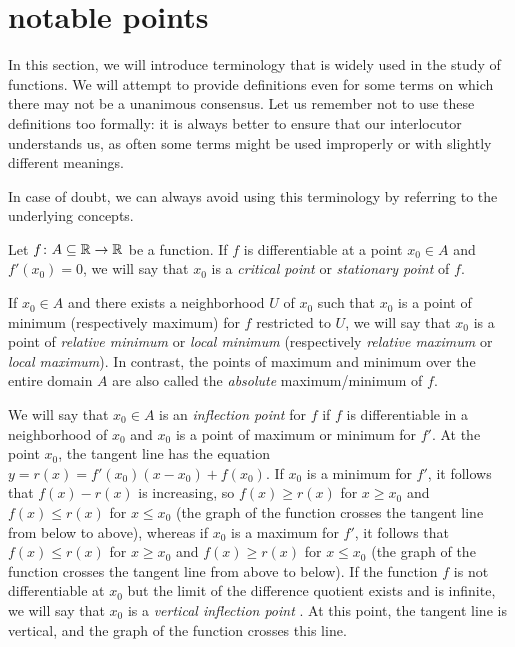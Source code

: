 \section{notable points}

In this section, we will introduce terminology that is widely used in the study
of functions. We will attempt to provide definitions even for some terms on
which there may not be a unanimous consensus. Let us remember not to use these
definitions too formally: it is always better to ensure that our interlocutor
understands us, as often some terms might be used improperly or with slightly
different meanings.

In case of doubt, we can always avoid using this terminology by referring to the
underlying concepts.

\begin{definition}
Let $f\colon A \subseteq {\mathbb R} \to {\mathbb R}$ be a function. If $f$ is differentiable at a
point $x_0\in A$ and $f'(x_0) = 0$, we will say that $x_0$ is a \emph{critical
point}%
%
or
\emph{stationary point}
of $f$.

If $x_0\in A$ and there exists a neighborhood $U$ of $x_0$ such that $x_0$ is a
point of minimum (respectively maximum) for $f$ restricted to $U$, we will say
that $x_0$ is a point of \emph{relative minimum}%
%
 or \emph{local minimum}
(respectively \emph{relative maximum} or \emph{local maximum}).
In contrast, the points of maximum and minimum over the entire domain $A$ are
also called the \emph{absolute} maximum/minimum of $f$.

We will say that $x_0\in A$ is an \emph{inflection point}%
%
 for $f$ if
$f$ is differentiable in a neighborhood of $x_0$ and $x_0$ is a point of maximum
or minimum for $f'$. At the point $x_0$, the tangent line has the equation
$y=r(x) = f'(x_0) (x-x_0) + f(x_0)$. If $x_0$ is a minimum for $f'$, it follows
that $f(x)-r(x)$ is increasing, so $f(x)\ge r(x)$ for $x\ge x_0$ and $f(x)\le
r(x)$ for $x\le x_0$ (the graph of the function crosses the tangent line from
below to above), whereas if $x_0$ is a maximum for $f'$, it follows that
$f(x)\le r(x)$ for $x\ge x_0$ and $f(x) \ge r(x)$ for $x\le x_0$ (the graph of
the function crosses the tangent line from above to below).
If the function $f$ is not differentiable at $x_0$ but the limit of the
difference quotient exists and is infinite, we will say that $x_0$ is a
\emph{vertical inflection point}%
%
. At this point, the tangent line is vertical, and the graph of the function crosses this line.


\end{definition}
